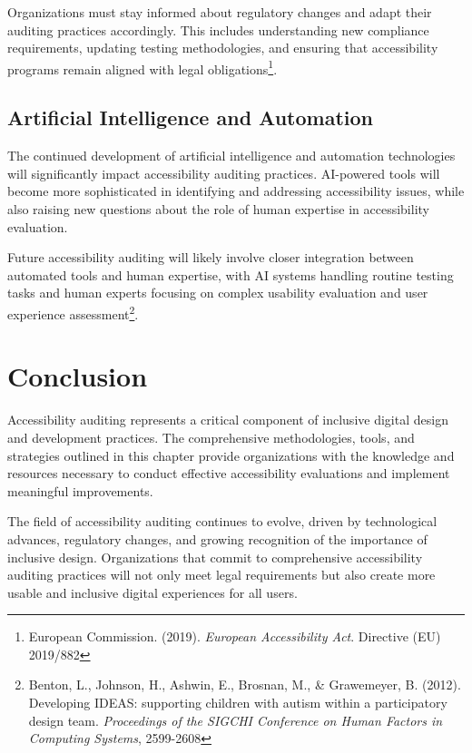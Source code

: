 Organizations must stay informed about regulatory changes and adapt their auditing practices accordingly. This includes understanding new compliance requirements, updating testing methodologies, and ensuring that accessibility programs remain aligned with legal obligations\footnote{European Commission. (2019). \textit{European Accessibility Act}. Directive (EU) 2019/882}.

\subsection{Artificial Intelligence and Automation}

The continued development of artificial intelligence and automation technologies will significantly impact accessibility auditing practices. AI-powered tools will become more sophisticated in identifying and addressing accessibility issues, while also raising new questions about the role of human expertise in accessibility evaluation.

Future accessibility auditing will likely involve closer integration between automated tools and human expertise, with AI systems handling routine testing tasks and human experts focusing on complex usability evaluation and user experience assessment\footnote{Benton, L., Johnson, H., Ashwin, E., Brosnan, M., \& Grawemeyer, B. (2012). Developing IDEAS: supporting children with autism within a participatory design team. \textit{Proceedings of the SIGCHI Conference on Human Factors in Computing Systems}, 2599-2608}.

\section{Conclusion}\label{sec:conclusion-audit}

Accessibility auditing represents a critical component of inclusive digital design and development practices. The comprehensive methodologies, tools, and strategies outlined in this chapter provide organizations with the knowledge and resources necessary to conduct effective accessibility evaluations and implement meaningful improvements.

The field of accessibility auditing continues to evolve, driven by technological advances, regulatory changes, and growing recognition of the importance of inclusive design. Organizations that commit to comprehensive accessibility auditing practices will not only meet legal requirements but also create more usable and inclusive digital experiences for all users.

